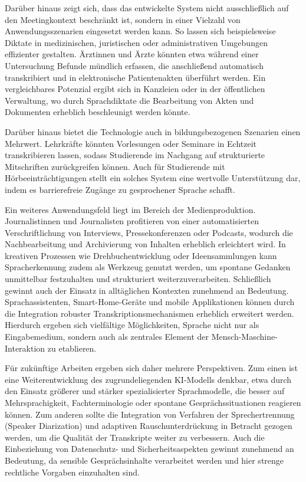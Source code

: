 Darüber hinaus zeigt sich, dass das entwickelte System nicht ausschließlich auf den Meetingkontext beschränkt ist, sondern in einer Vielzahl von Anwendungsszenarien eingesetzt werden kann. So lassen sich beispielsweise Diktate in medizinischen, juristischen oder administrativen Umgebungen effizienter gestalten. Ärztinnen und Ärzte könnten etwa während einer Untersuchung Befunde mündlich erfassen, die anschließend automatisch transkribiert und in elektronische Patientenakten überführt werden. Ein vergleichbares Potenzial ergibt sich in Kanzleien oder in der öffentlichen Verwaltung, wo durch Sprachdiktate die Bearbeitung von Akten und Dokumenten erheblich beschleunigt werden könnte.

Darüber hinaus bietet die Technologie auch in bildungsbezogenen Szenarien einen Mehrwert. Lehrkräfte könnten Vorlesungen oder Seminare in Echtzeit transkribieren lassen, sodass Studierende im Nachgang auf strukturierte Mitschriften zurückgreifen können. Auch für Studierende mit Hörbeeinträchtigungen stellt ein solches System eine wertvolle Unterstützung dar, indem es barrierefreie Zugänge zu gesprochener Sprache schafft.

Ein weiteres Anwendungsfeld liegt im Bereich der Medienproduktion. Journalistinnen und Journalisten profitieren von einer automatisierten Verschriftlichung von Interviews, Pressekonferenzen oder Podcasts, wodurch die Nachbearbeitung und Archivierung von Inhalten erheblich erleichtert wird. In kreativen Prozessen wie Drehbuchentwicklung oder Ideensammlungen kann Spracherkennung zudem als Werkzeug genutzt werden, um spontane Gedanken unmittelbar festzuhalten und strukturiert weiterzuverarbeiten. Schließlich gewinnt auch der Einsatz in alltäglichen Kontexten zunehmend an Bedeutung. Sprachassistenten, Smart-Home-Geräte und mobile Applikationen können durch die Integration robuster Transkriptionsmechanismen erheblich erweitert werden. Hierdurch ergeben sich vielfältige Möglichkeiten, Sprache nicht nur als Eingabemedium, sondern auch als zentrales Element der Mensch-Maschine-Interaktion zu etablieren.

Für zukünftige Arbeiten ergeben sich daher mehrere Perspektiven. Zum einen ist eine Weiterentwicklung des zugrundeliegenden KI-Modells denkbar, etwa durch den Einsatz größerer und stärker spezialisierter Sprachmodelle, die besser auf Mehrsprachigkeit, Fachterminologie oder spontane Gesprächssituationen reagieren können. Zum anderen sollte die Integration von Verfahren der Sprechertrennung (Speaker Diarization) und adaptiven Rauschunterdrückung in Betracht gezogen werden, um die Qualität der Transkripte weiter zu verbessern. Auch die Einbeziehung von Datenschutz- und Sicherheitsaspekten gewinnt zunehmend an Bedeutung, da sensible Gesprächsinhalte verarbeitet werden und hier strenge rechtliche Vorgaben einzuhalten sind.

